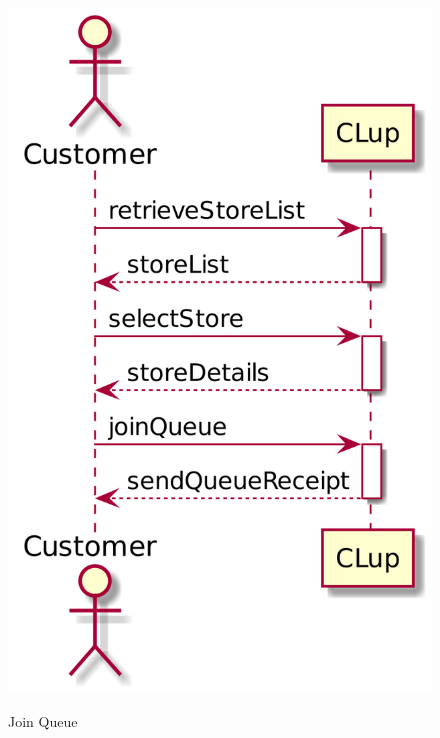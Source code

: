 \begin{figure}[H]
    \centering
    \begin{minipage}[b]{0.4\textwidth}
      \includegraphics[width=\textwidth]{uml/join_queue.png}
      \label{fig:seqdiag-join-queue}
      \caption{Join Queue}
    \end{minipage}
    \hfill
    \begin{minipage}[b]{0.4\textwidth}

\end{minipage}
\end{figure}

